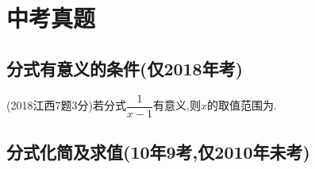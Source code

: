 \documentclass[cn,blue,12pt]{elegantbook}
\renewcommand \tkt[1]{{\CJKunderline[hidden=true, skip=true, thickness=1pt]{#1}}}
\begin{document}
\section{中考真题}%

\subsection{分式有意义的条件(仅2018年考)}%
\begin{zhenti}[resume]
\item (2018江西7题3分)若分式\(\dfrac{1}{x-1}\)有意义,则\(x\)的取值范围为\tkt{\(x\ne 1\)}.
\end{zhenti}

\subsection{分式化简及求值(10年9考,仅2010年未考)}%
\end{document}
